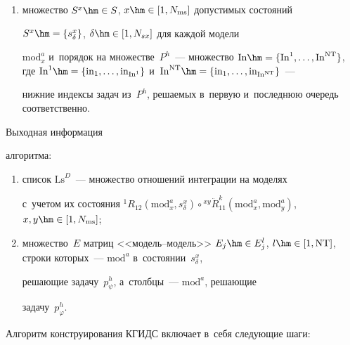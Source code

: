 \begin{enumerate}[(1)]
преобразования представления информации с~одного языка описания модели 

на другие; 

\item множество $S^x\hm\in S$, $x\hm\in [1, N_{\mathrm{ms}}]$ допустимых состояний 

$S^x\hm= \left\{ s_\delta^x\right\}$, $\delta\hm\in [1, N_{sx}]$ для каждой модели 

$\mathrm{mod}_x^a$ и~порядок на множестве~$P^h$~--- множество $\mathrm{In}\hm= \{ \mathrm{In}^1, 

\ldots , \mathrm{In}^{\mathrm{NT}}\}$, где $\mathrm{In}^1\hm= \{

\mathrm{in}_1, \ldots , \mathrm{in}_{\mathrm{In}^1}\}$ и~$\mathrm{In}^{\mathrm{NT}}\hm= \{ 

\mathrm{in}_1, \ldots , \mathrm{in}_{\mathrm{In}^{\mathrm{NT}}}\}$~--- 

нижние индексы задач из~$P^h$, ре\-ша\-емых в~первую и~по\-след\-нюю очередь соответственно.

\end{enumerate}



 Выходная информация 

алгоритма: 

\begin{enumerate}[(1)]

\item список $\mathrm{Ls}^D$~--- множество отношений интеграции на моделях 

с~учетом их состояния ${}^1R_{12}\left( \mathrm{mod}_x^a, s^x_{\delta}\right) \circ 

{}^{xy} \ddot{R}_{11}^k \left( \mathrm{mod}_x^a, \mathrm{mod}_y^a\right)$, $x,y\hm\in  

[1, N_{\mathrm{ms}}]$; 

\item множество~$E$ мат\-риц <<мо\-дель--мо\-дель>> $E_j\hm\in 

E_j^l$, $l\hm\in [1, \mathrm{NT}]$, строки которых~--- $\mathrm{mod}^a$ в~состоянии~$s^x_\delta$, 

ре\-ша\-ющие задачу~$p_{\psi}^h$, а~столб\-цы~--- $\mathrm{mod}^a$, ре\-ша\-ющие 

задачу~$p^h_{\varphi}$. 

\end{enumerate}

  

  Алгоритм конструирования КГИДС включает в~себя сле\-ду\-ющие шаги:

